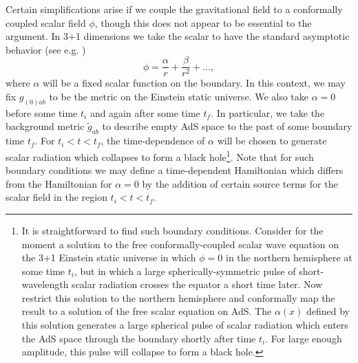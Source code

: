 \documentclass[12pt,onecolumn,eqsecnum,aps,prd,nofootinbib]{revtex4}
\def\be{\begin{equation}}
\def\ee{\end{equation}}
\begin{document}
Certain simplifications arise if we couple the gravitational field
to a conformally coupled scalar field $\phi$, though this does not
appear to be essential to the argument. In 3+1 dimensions we take
the scalar to have the standard asymptotic behavior (see e.g.
\cite{BF})
 \be
 \phi = \frac{\alpha}{r} + \frac{\beta}{r^2} + \dots ,
 \ee
where $\alpha$ will be a fixed scalar function on the boundary.   In
this context, we may fix $g_{(0)ab}$ to be the metric on the
Einstein static universe.  We also take $\alpha =0$
 before some time $t_i$ and again after some
time $t_f$.  In particular, we take the background metric $\tilde
g_{ab}$ to describe empty AdS space to the past of some boundary
time $t_f$. For $t_i < t < t_f$, the time-dependence of $\alpha$
will be chosen to generate scalar radiation which collapses to form
a black hole\footnote{It is straightforward to find such boundary
conditions.  Consider for the moment a solution to the free
conformally-coupled scalar wave equation on the 3+1 Einstein static
universe in which $\phi =0$ in the northern hemisphere at some time
$t_i$, but in which a large spherically-symmetric pulse of
short-wavelength scalar radiation crosses the equator a short time
later. Now restrict this solution to the northern hemisphere and
conformally map the result to a solution of the free scalar equation
on AdS. The $\alpha(x)$ defined by this solution generates a large
spherical pulse of scalar radiation which enters the AdS space
through the boundary shortly after time $t_i$.  For large enough
amplitude, this pulse will collapse to form a black hole.}.  Note
that for such boundary conditions we may define a time-dependent
Hamiltonian which differs from the Hamiltonian for $\alpha =0$ by
the addition of certain source terms for the scalar field in the
region $t_i < t < t_f$.
\end{document}
